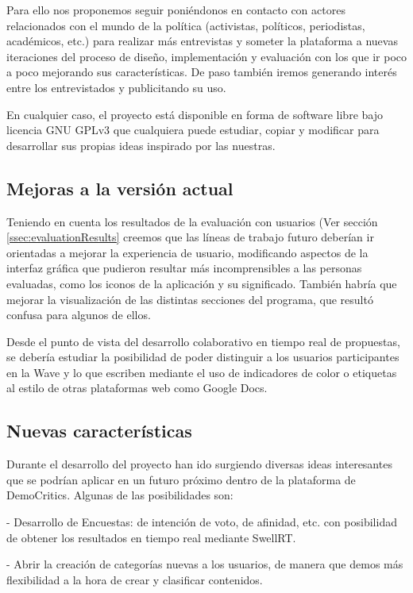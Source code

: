 Para ello nos proponemos seguir poniéndonos en contacto con actores relacionados con el mundo de la política (activistas, políticos, periodistas, académicos, etc.) para realizar más entrevistas y someter la plataforma a nuevas iteraciones del proceso de diseño, implementación y evaluación con los que ir poco a poco mejorando sus características. De paso también iremos generando interés entre los entrevistados y publicitando su uso.

En cualquier caso, el proyecto está disponible en forma de software libre bajo licencia GNU GPLv3 que cualquiera puede estudiar, copiar y modificar para desarrollar sus propias ideas inspirado por las nuestras. 

\subsection{Mejoras a la versión actual}

Teniendo en cuenta los resultados de la evaluación con usuarios  (Ver sección \ref{ssec:evaluationResults} creemos que las líneas de trabajo futuro deberían ir orientadas a mejorar la experiencia de usuario, modificando aspectos de la interfaz gráfica que pudieron resultar más incomprensibles a las personas evaluadas, como los iconos de la aplicación y su significado. También habría que mejorar la visualización de las distintas secciones del programa, que resultó confusa para algunos de ellos. 

Desde el punto de vista del desarrollo colaborativo en tiempo real de propuestas, se debería estudiar la posibilidad de poder distinguir a los usuarios participantes en la Wave y lo que escriben mediante el uso de indicadores de color o etiquetas al estilo de otras plataformas web como Google Docs. 

\subsection{Nuevas características}

Durante el desarrollo del proyecto han ido surgiendo diversas ideas interesantes que se podrían aplicar en un futuro próximo dentro de la plataforma de DemoCritics. Algunas de las posibilidades son:

- Desarrollo de Encuestas: de intención de voto, de afinidad, etc. con posibilidad de obtener los resultados en tiempo real mediante SwellRT.

- Abrir la creación de categorías nuevas a los usuarios, de manera que demos más flexibilidad a la hora de crear y clasificar contenidos.

